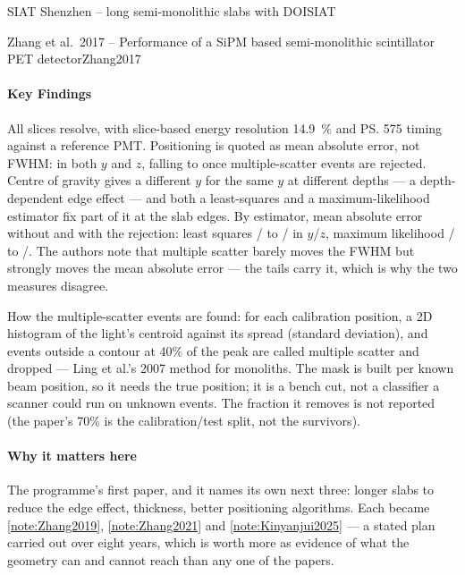 \begin{programnote}{SIAT Shenzhen -- long semi-monolithic slabs with DOI}{SIAT}
\begin{papernote}{Zhang et al.\ 2017 -- Performance of a SiPM based semi-monolithic scintillator PET detector}{Zhang2017}
\paragraph{Key Findings}
All  slices resolve, with slice-based energy resolution
\qty{14.9}{\percent} and \ps{575} timing against a reference PMT. Positioning is quoted as mean
absolute error, not FWHM:  in both $y$ and $z$, falling to 
once multiple-scatter events are rejected. Centre of gravity gives a different
$y$ for the same $y$ at different depths --- a depth-dependent edge effect ---
and both a least-squares and a maximum-likelihood estimator fix part of it at
the slab edges.
By estimator, mean absolute error without and with the rejection: least
squares / to / in $y$/$z$, maximum
likelihood / to /. The authors note that
multiple scatter barely moves the FWHM but strongly moves the mean absolute
error --- the tails carry it, which is why the two measures disagree.

How the multiple-scatter events are found: for each calibration position, a
2D histogram of the light's centroid against its spread (standard
deviation), and events outside a contour at 40\% of the peak are called
multiple scatter and dropped --- Ling et al.'s 2007 method for monoliths.
The mask is built per known beam position, so it needs the true position;
it is a bench cut, not a classifier a scanner could run on unknown events.
The fraction it removes is not reported (the paper's 70\% is the
calibration/test split, not the survivors).

\paragraph{Why it matters here}
The programme's first paper, and it names its own next three: longer slabs to
reduce the edge effect,  thickness, better positioning algorithms. Each
became \ref{note:Zhang2019}, \ref{note:Zhang2021} and
\ref{note:Kinyanjui2025} --- a stated plan carried out over eight years, which
is worth more as evidence of what the geometry can and cannot reach than any
one of the papers.


\end{papernote}
\end{programnote}
